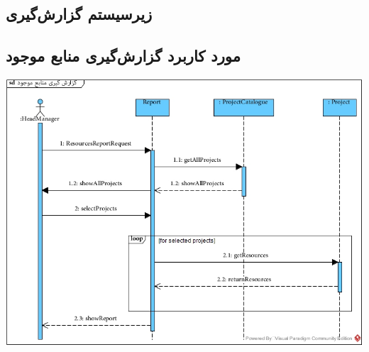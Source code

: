 \newpage
\subsection{زیرسیستم گزارش‌گیری}

\vspace{2cm}
\subsection*{مورد کاربرد گزارش‌گیری منابع موجود}
\vspace{2cm}
\begin{center}
\includegraphics[width=\textwidth]{SequenceDiagrams/40.jpg}
\end{center}

